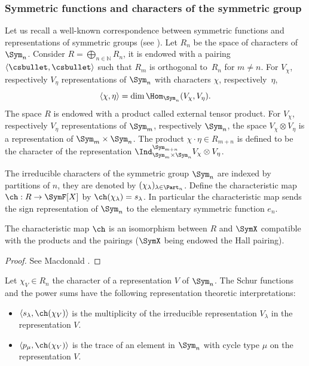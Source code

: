 \subsubsection{Symmetric functions and characters of the symmetric group}
Let us recall a well-known correspondence between symmetric functions and representations of symmetric groups (see \cite{Macdonald}). Let $R_n$ be the space of characters of $\Sym_n$. Consider $R=\bigoplus_{n\in\mathbb{N}} R_n$, it is endowed with a pairing $\langle\csbullet,\csbullet\rangle$ such that $R_m$ is orthogonal to~$R_n$ for $m\ne n$. For $V_\chi$, respectively $V_\eta$ representations of $\Sym_n$ with characters $\chi$, respectively~$\eta$,
\[
\left\langle \chi,\eta\right\rangle = \dim \Hom_{\Sym_n}(V_{\chi}, V_{\eta}).
\]
The space $R$ is endowed with a product called external tensor product. For $V_\chi$, respectively $V_{\eta}$ representations of $\Sym_m$, respectively $\Sym_n$, the space $V_\chi \otimes V_\eta$ is a representation of $\Sym_m \times \Sym_n$. The product $\chi\cdot\eta\in R_{m+n}$ is defined to be the character of the representation $\Ind_{\Sym_m\times\Sym_n}^{\Sym_{m+n}}V_\chi \otimes V_\eta$.

The irreducible characters of the symmetric group $\Sym_n$ are indexed by partitions of $n$, they are denoted by $(\chi_{\lambda})_{\lambda\in\Part_n}$. Define the characteristic map $\ch:R\to \SymF[X]$ by $\ch(\chi_{\lambda})=s_{\lambda}$.
In particular the characteristic map sends the sign representation of $\Sym_n$ to the elementary symmetric function $e_n$.

\begin{proposition}\label{prop_characteristic_map}
The characteristic map $\ch$ is an isomorphism between $R$ and $\SymX$ compatible with the products and the pairings ($\SymX$ being endowed the Hall pairing).
\end{proposition}
\begin{proof}
See Macdonald \cite[I-7]{Macdonald}.
\end{proof}

\begin{remark}\label{remark_trace_mult}
Let $\chi_V\in R_n$ the character of a representation $V$ of $\Sym_n$. The Schur functions and the power sums have the following representation theoretic interpretations:
\begin{itemize}
\item $\left\langle s_{\lambda},\ch(\chi_{V})\right\rangle$ is the multiplicity of the irreducible representation $V_{\lambda}$ in the representation $V$.
\item $\left\langle p_{\mu},\ch(\chi_{V})\right\rangle$ is the trace of an element in $\Sym_n$ with cycle type $\mu$ on the representation $V$.
\end{itemize}
\end{remark}

